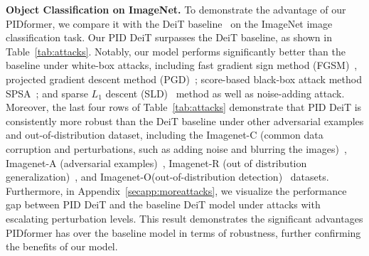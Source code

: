 \textbf{Object Classification on ImageNet.}
To demonstrate the advantage of our PIDformer, we compare it with the DeiT baseline~\cite{touvron2020deit} on the ImageNet image classification task. Our PID DeiT surpasses the DeiT baseline, as shown in Table~\ref{tab:attacks}. Notably, our model performs significantly better than the baseline under white-box attacks, including fast gradient sign method (FGSM)~\cite{dong2020benchmarking}, projected gradient descent method (PGD)~\cite{tramer2019adversarial}; score-based black-box attack method SPSA~\cite{pmlr-v80-uesato18a}; and sparse $L_1$ descent (SLD)~\cite{NEURIPS2019_5d4ae76f} method as well as noise-adding attack. Moreover, the last four rows of Table~\ref{tab:attacks} demonstrate that PID DeiT is consistently more robust than the DeiT baseline under other adversarial examples and out-of-distribution dataset, including the Imagenet-C (common data corruption and perturbations, such as adding noise and blurring the images)~\cite{hendrycks2019benchmarking}, Imagenet-A (adversarial examples)~\cite{hendrycks2021natural}, Imagenet-R (out of distribution generalization)~\cite{hendrycks2021many}, and Imagenet-O(out-of-distribution detection)~\cite{hendrycks2021natural} datasets. Furthermore, in Appendix~\ref{secapp:moreattacks}, we visualize the performance gap between PID DeiT and the baseline DeiT model under attacks with escalating perturbation levels. This result demonstrates the significant advantages PIDformer has over the baseline model in terms of robustness, further confirming the benefits of our model.
